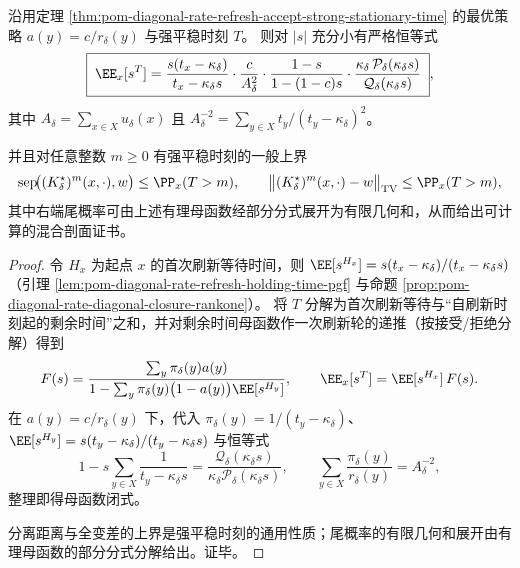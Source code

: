 \begin{theorem}\label{thm:pom-diagonal-rate-sst-pgf-Qdelta}
沿用定理 \ref{thm:pom-diagonal-rate-refresh-accept-strong-stationary-time} 的最优策略 \(a(y)=c/r_\delta(y)\) 与强平稳时刻 \(T\)。
则对 \(|s|\) 充分小有严格恒等式
\[
\boxed{\;
\EE_x[s^{T}]
=\frac{s(t_x-\kappa_\delta)}{t_x-\kappa_\delta s}\cdot
\frac{c}{A_\delta^{2}}\cdot
\frac{1-s}{1-(1-c)s}\cdot
\frac{\kappa_\delta\,\mathcal P_\delta(\kappa_\delta s)}{\mathcal Q_\delta(\kappa_\delta s)}\; } ,
\]
其中 \(A_\delta=\sum_{x\in X}u_\delta(x)\) 且 \(A_\delta^{-2}=\sum_{y\in X} t_y/(t_y-\kappa_\delta)^2\)。
\par
并且对任意整数 \(m\ge 0\) 有强平稳时刻的一般上界
\[
\mathrm{sep}\!\bigl((K^\star_\delta)^m(x,\cdot),w\bigr)\le \PP_x(T>m),
\qquad
\bigl\|(K^\star_\delta)^m(x,\cdot)-w\bigr\|_{\mathrm{TV}}\le \PP_x(T>m),
\]
其中右端尾概率可由上述有理母函数经部分分式展开为有限几何和，从而给出可计算的混合剖面证书。
\end{theorem}
\begin{proof}
令 \(H_x\) 为起点 \(x\) 的首次刷新等待时间，则 \(\EE[s^{H_x}]=s(t_x-\kappa_\delta)/(t_x-\kappa_\delta s)\)（引理 \ref{lem:pom-diagonal-rate-refresh-holding-time-pgf} 与命题 \ref{prop:pom-diagonal-rate-diagonal-closure-rankone}）。
将 \(T\) 分解为首次刷新等待与“自刷新时刻起的剩余时间”之和，并对剩余时间母函数作一次刷新轮的递推（按接受/拒绝分解）得到
\[
F(s)=\frac{\sum_y \pi_\delta(y)a(y)}{1-\sum_y\pi_\delta(y)\bigl(1-a(y)\bigr)\EE[s^{H_y}]},
\qquad \EE_x[s^T]=\EE[s^{H_x}]\,F(s).
\]
在 \(a(y)=c/r_\delta(y)\) 下，代入 \(\pi_\delta(y)=1/(t_y-\kappa_\delta)\)、
\(
\EE[s^{H_y}]=s(t_y-\kappa_\delta)/(t_y-\kappa_\delta s)
\)
与恒等式
\[
1-s\sum_{y\in X}\frac{1}{t_y-\kappa_\delta s}=\frac{\mathcal Q_\delta(\kappa_\delta s)}{\kappa_\delta\mathcal P_\delta(\kappa_\delta s)},
\qquad
\sum_{y\in X}\frac{\pi_\delta(y)}{r_\delta(y)}=A_\delta^{-2},
\]
整理即得母函数闭式。
\par
分离距离与全变差的上界是强平稳时刻的通用性质；尾概率的有限几何和展开由有理母函数的部分分式分解给出。证毕。
\end{proof}



\endinput
